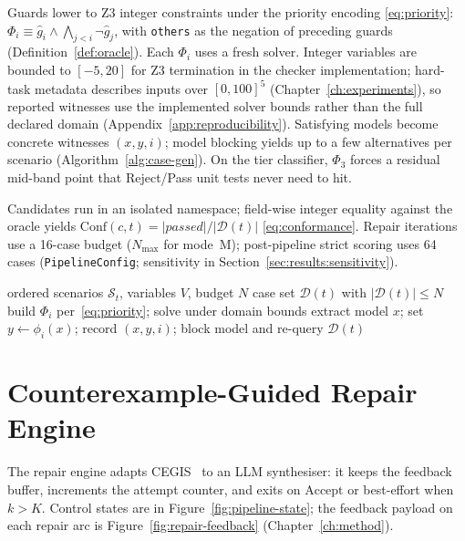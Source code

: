 Guards lower to Z3 integer constraints under the priority encoding
\eqref{eq:priority}:
$\Phi_i \equiv \widehat{g}_i \land \bigwedge_{j<i}\lnot\widehat{g}_j$,
with \texttt{others} as the negation of preceding guards
(Definition~\ref{def:oracle}).
Each $\Phi_i$ uses a fresh solver.
Integer variables are bounded to $[-5,20]$ for Z3 termination in the checker
implementation; hard-task metadata describes inputs over $[0,100]^5$
(Chapter~\ref{ch:experiments}), so reported witnesses use the implemented
solver bounds rather than the full declared domain
(Appendix~\ref{app:reproducibility}).
Satisfying models become concrete witnesses $(x,y,i)$; model blocking yields
up to a few alternatives per scenario (Algorithm~\ref{alg:case-gen}).
On the tier classifier, $\Phi_3$ forces a residual mid-band point that
Reject/Pass unit tests never need to hit.

Candidates run in an isolated namespace; field-wise integer equality against
the oracle yields
$\mathrm{Conf}(c,t) = |\mathit{passed}| / |\mathcal{D}(t)|$
\eqref{eq:conformance}.
Repair iterations use a 16-case budget ($N_{\max}$ for mode~M); post-pipeline
strict scoring uses 64 cases (\texttt{PipelineConfig}; sensitivity in
Section~\ref{sec:results:sensitivity}).

\begin{algorithm}[t]
\caption{Z3-Based Concrete Case Generation (sketch)}
\label{alg:case-gen}
\begin{algorithmic}[1]
\Require ordered scenarios $\mathcal{S}_t$, variables $V$, budget $N$
\Ensure case set $\mathcal{D}(t)$ with $|\mathcal{D}(t)| \le N$
  \State build $\Phi_i$ per~\eqref{eq:priority}; solve under domain bounds
    \State extract model $x$; set $y \leftarrow \phi_i(x)$;
           record $(x,y,i)$; block model and re-query
  \EndWhile
\EndFor
\State \Return $\mathcal{D}(t)$
\end{algorithmic}
\end{algorithm}

\section{Counterexample-Guided Repair Engine}
\label{sec:impl:repair}

The repair engine adapts CEGIS~\citep{solarlezama2008sketching} to an LLM
synthesiser: it keeps the feedback buffer, increments the attempt counter,
and exits on $\mathrm{Accept}$ or best-effort when $k > K$.
Control states are in Figure~\ref{fig:pipeline-state}; the feedback payload
on each repair arc is Figure~\ref{fig:repair-feedback}
(Chapter~\ref{ch:method}).

